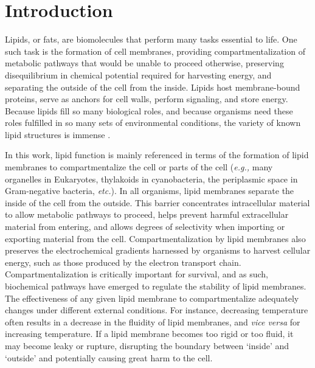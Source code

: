 \chapter[INTRODUCTION]{Introduction}


Lipids, or fats, are biomolecules that perform many tasks essential to life. One such task is the formation of cell membranes, providing compartmentalization of metabolic pathways that would be unable to proceed otherwise, preserving disequilibrium in chemical potential required for harvesting energy, and separating the outside of the cell from the inside. Lipids host membrane-bound proteins, serve as anchors for cell walls, perform signaling, and store energy. Because lipids fill so many biological roles, and because organisms need these roles fulfilled in so many sets of environmental conditions, the variety of known lipid structures is immense \citep[\textit{e.g.,}][]{Sturt_Intact_2004, belin2018hopanoid, van2008membrane, Yoshinaga_Systematic_2011, schouten2013organic}.

In this work, lipid function is mainly referenced in terms of the formation of lipid membranes to compartmentalize the cell or parts of the cell (\textit{e.g.,} many organelles in Eukaryotes, thylakoids in cyanobacteria, the periplasmic space in Gram-negative bacteria, \textit{etc.}). In all organisms, lipid membranes separate the inside of the cell from the outside. This barrier concentrates intracellular material to allow metabolic pathways to proceed, helps prevent harmful extracellular material from entering, and allows degrees of selectivity when importing or exporting material from the cell. Compartmentalization by lipid membranes also preserves the electrochemical gradients harnessed by organisms to harvest cellular energy, such as those produced by the electron transport chain. Compartmentalization is critically important for survival, and as such, biochemical pathways have emerged to regulate the stability of lipid membranes. The effectiveness of any given lipid membrane to compartmentalize adequately changes under different external conditions. For instance, decreasing temperature often results in a decrease in the fluidity of lipid membranes, and \textit{vice versa} for increasing temperature. If a lipid membrane becomes too rigid or too fluid, it may become leaky or rupture, disrupting the boundary between `inside' and `outside' and potentially causing great harm to the cell. %

